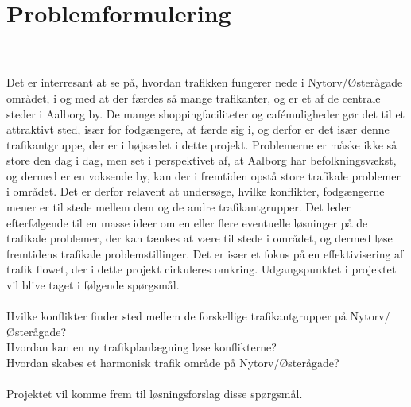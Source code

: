 \chapter{Problemformulering}
\label{chap:problemformulering}

\\\\
Det er interresant at se på, hvordan trafikken fungerer nede i Nytorv/Østerågade området, i og med at der færdes så mange trafikanter, og er et af de centrale steder i Aalborg by. De mange shoppingfaciliteter og cafémuligheder gør det til et attraktivt sted, især for fodgængere, at færde sig i, og derfor er det især denne trafikantgruppe, der er i højsædet i dette projekt. Problemerne er måske ikke så store den dag i dag, men set i perspektivet af, at Aalborg har befolkningsvækst, og dermed er en voksende by, kan der i fremtiden opstå store trafikale problemer i området. Det er derfor relavent at undersøge, hvilke konflikter, fodgængerne mener er til stede mellem dem og de andre trafikantgrupper.
Det leder efterfølgende til en masse ideer om en eller flere eventuelle løsninger på de trafikale problemer, der kan tænkes at være til stede i området, og dermed løse fremtidens trafikale problemstillinger. Det er især et fokus på en effektivisering af trafik flowet, der i dette projekt cirkuleres omkring. Udgangspunktet i projektet vil blive taget i følgende spørgsmål.
\\\\
Hvilke konflikter finder sted mellem de forskellige trafikantgrupper på Nytorv/Østerågade?
\\
Hvordan kan en ny trafikplanlægning løse konflikterne?
\\
Hvordan skabes et harmonisk trafik område på Nytorv/Østerågade? 
\\\\
Projektet vil komme frem til løsningsforslag disse spørgsmål.



